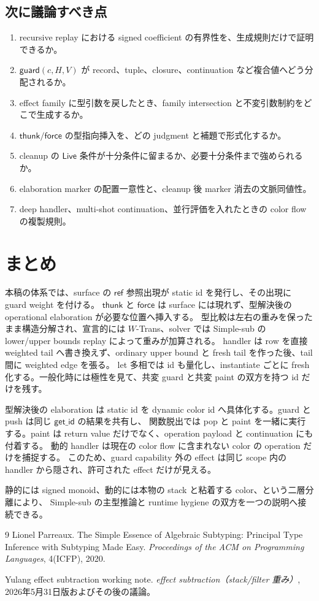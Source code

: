 \documentclass[uplatex,dvipdfmx,a4paper,11pt]{jsarticle}
\theoremstyle{jpplain}
\newcommand{\Live}{\mathsf{Live}}
\newcommand{\thunk}{\mathsf{thunk}}
\newcommand{\force}{\mathsf{force}}
\newcommand{\getid}{\mathsf{get\_id}}
\newcommand{\guard}{\mathsf{guard}}
\begin{document}
\subsection{次に議論すべき点}
\begin{enumerate}
  \item recursive replay における signed coefficient の有界性を、生成規則だけで証明できるか。
  \item $\guard(c,H,V)$ が record、tuple、closure、continuation など複合値へどう分配されるか。
  \item effect family に型引数を戻したとき、family intersection と不変引数制約をどこで生成するか。
  \item \(\thunk/\force\) の型指向挿入を、どの judgment と補題で形式化するか。
  \item cleanup の $\Live$ 条件が十分条件に留まるか、必要十分条件まで強められるか。
  \item elaboration marker の配置一意性と、cleanup 後 marker 消去の文脈同値性。
  \item deep handler、multi-shot continuation、並行評価を入れたときの color flow の複製規則。
\end{enumerate}

\section{まとめ}

本稿の体系では、surface の \(\mathsf{ref}\) 参照出現が static id を発行し、その出現に guard weight を付ける。
\(\thunk\) と \(\force\) は surface には現れず、型解決後の operational elaboration が必要な位置へ挿入する。
型比較は左右の重みを保ったまま構造分解され、宣言的には \(W\)-Trans、solver では Simple-sub の
lower/upper bounds replay によって重みが加算される。
handler は row を直接 weighted tail へ書き換えず、ordinary upper bound と fresh tail を作った後、tail 間に weighted edge を張る。
let 多相では id も量化し、instantiate ごとに fresh 化する。一般化時には極性を見て、共変 guard と共変 paint の双方を持つ id だけを残す。

型解決後の elaboration は static id を dynamic color id へ具体化する。guard と push は同じ $\getid$ の結果を共有し、
関数脱出では pop と paint を一緒に実行する。paint は return value だけでなく、operation payload と continuation にも付着する。
動的 handler は現在の color flow に含まれない color の operation だけを捕捉する。
このため、guard capability 外の effect は同じ scope 内の handler から隠され、許可された effect だけが見える。

静的には signed monoid、動的には本物の stack と粘着する color、という二層分離により、
Simple-sub の主型推論と runtime hygiene の双方を一つの説明へ接続できる。

\begin{thebibliography}{9}
Lionel Parreaux.
\newblock The Simple Essence of Algebraic Subtyping: Principal Type Inference with Subtyping Made Easy.
\newblock \emph{Proceedings of the ACM on Programming Languages}, 4(ICFP), 2020.

Yulang effect subtraction working note.
\newblock \emph{effect subtraction（stack/filter 重み）}, 2026年5月31日版およびその後の議論。
\end{thebibliography}
\end{document}

